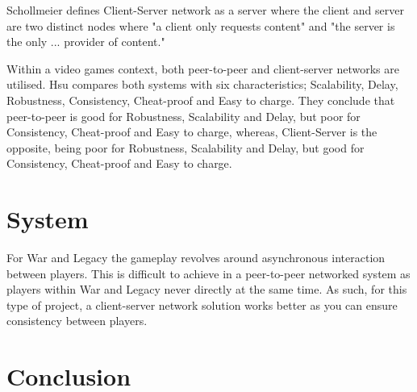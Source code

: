 \documentclass{article}
\begin{document}
Schollmeier defines Client-Server network as a server where the client and server are two distinct nodes where "a client only requests content" and "the server is the only ... provider of content."

Within a video games context, both peer-to-peer and client-server networks are utilised. Hsu compares both systems\cite{hsu2003} with six characteristics; Scalability, Delay, Robustness, Consistency, Cheat-proof and Easy to charge. They conclude that peer-to-peer is good for Robustness, Scalability and Delay, but poor for Consistency, Cheat-proof and Easy to charge, whereas, Client-Server is the opposite, being poor for Robustness, Scalability and Delay, but good for Consistency, Cheat-proof and Easy to charge.

\section{System}
For War and Legacy the gameplay revolves around asynchronous interaction between players. This is difficult to achieve in a peer-to-peer networked system as players within War and Legacy never directly at the same time. As such, for this type of project, a client-server network solution works better as you can ensure consistency between players.

\section{Conclusion}



\printbibliography[filter=papers]
\printbibliography[type=software, title={Games}]

\listoffigures
\end{document}
